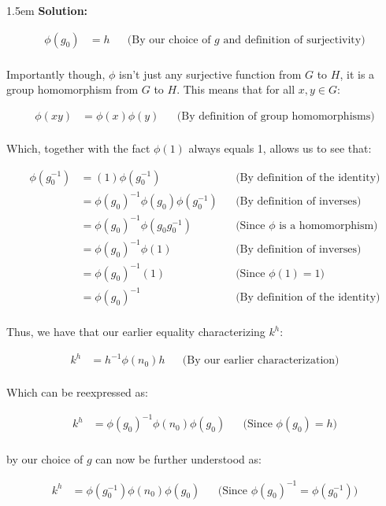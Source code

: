 \documentclass{article}
\newenvironment{solution}{
	\vspace{.5em}
	\par
	\begin{adjustwidth}{1.5em}{}
	\textbf{{Solution:}}
	\par
	\vspace{.5em}
}{
	\vspace{1em}
	\end{adjustwidth}
	\setcounter{step}{0}
	\newpage
}
\newcounter{step}
\begin{document}
\begin{solution}
	\begin{align*}
		\phi(g_{0}) &= h &&\text{(By our choice of $g$ and definition of surjectivity)} \\
	\end{align*}

	Importantly though, $\phi$ isn't just any surjective function from $G$ to $H$, it is a group homomorphism from $G$ to $H$. This means that for all $x, y \in G$:

	\begin{align*}
		\phi(xy) &= \phi(x)\phi(y) &&\text{(By definition of group homomorphisms)} \\
	\end{align*}

	Which, together with the fact $\phi(1)$ always equals 1, allows us to see that:

	\begin{align*}
		\phi(g_{0}^{-1}) &= (1)\phi(g_{0}^{-1}) &&\text{(By definition of the identity)} \\
		&= \phi(g_{0})^{-1}\phi(g_{0})\phi(g_{0}^{-1}) &&\text{(By definition of inverses)} \\
		&= \phi(g_{0})^{-1}\phi(g_{0}g_{0}^{-1}) &&\text{(Since $\phi$ is a homomorphism)} \\
		&= \phi(g_{0})^{-1}\phi(1) &&\text{(By definition of inverses)} \\
		&= \phi(g_{0})^{-1}(1) &&\text{(Since $\phi(1) = 1$)} \\
		&= \phi(g_{0})^{-1} &&\text{(By definition of the identity)} \\
	\end{align*}

	Thus, we have that our earlier equality characterizing $k^{h}$:

	\begin{align*}
		k^{h} &= h^{-1}\phi(n_{0})h &&\text{(By our earlier characterization)} \\
	\end{align*}

	Which can be reexpressed as:

	\begin{align*}
		k^{h} &= \phi(g_{0})^{-1}\phi(n_{0})\phi(g_{0}) &&\text{(Since $\phi(g_{0}) = h$)} \\
	\end{align*}

	by our choice of $g$ can now be further understood as:

	\begin{align*}
		k^{h} &= \phi(g_{0}^{-1})\phi(n_{0})\phi(g_{0}) &&\text{(Since $\phi(g_{0})^{-1} = \phi(g_{0}^{-1})$)} \\
	\end{align*}


\end{solution}
\end{document}
